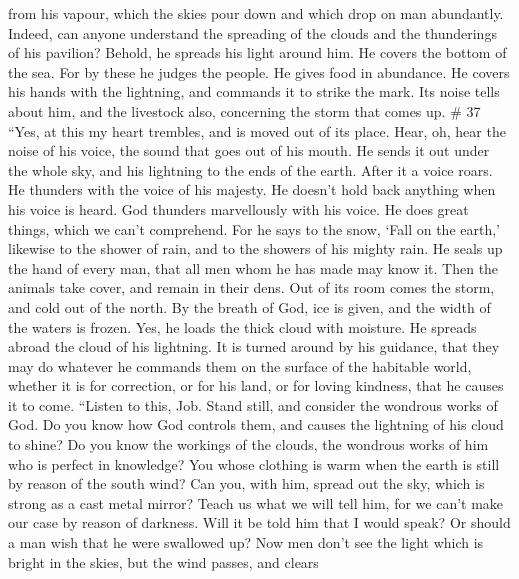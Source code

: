 from his vapour,  which the skies pour down and which drop
on man abundantly.  Indeed, can anyone understand the
spreading of the clouds and the thunderings of his pavilion?
 Behold, he spreads his light around him. He covers the
bottom of the sea.  For by these he judges the people. He
gives food in abundance.  He covers his hands with the
lightning, and commands it to strike the mark.  Its noise
tells about him, and the livestock also, concerning the storm that comes
up. \# 37  ``Yes, at this my heart trembles, and is moved
out of its place.  Hear, oh, hear the noise of his voice,
the sound that goes out of his mouth.  He sends it out under
the whole sky, and his lightning to the ends of the earth. 
After it a voice roars. He thunders with the voice of his majesty. He
doesn't hold back anything when his voice is heard.  God
thunders marvellously with his voice. He does great things, which we
can't comprehend.  For he says to the snow, `Fall on the
earth,' likewise to the shower of rain, and to the showers of his mighty
rain.  He seals up the hand of every man, that all men whom
he has made may know it.  Then the animals take cover, and
remain in their dens.  Out of its room comes the storm, and
cold out of the north.  By the breath of God, ice is given,
and the width of the waters is frozen.  Yes, he loads the
thick cloud with moisture. He spreads abroad the cloud of his lightning.
 It is turned around by his guidance, that they may do
whatever he commands them on the surface of the habitable world,
 whether it is for correction, or for his land, or for
loving kindness, that he causes it to come.  ``Listen to
this, Job. Stand still, and consider the wondrous works of God.
 Do you know how God controls them, and causes the
lightning of his cloud to shine?  Do you know the workings
of the clouds, the wondrous works of him who is perfect in knowledge?
 You whose clothing is warm when the earth is still by
reason of the south wind?  Can you, with him, spread out
the sky, which is strong as a cast metal mirror?  Teach us
what we will tell him, for we can't make our case by reason of darkness.
 Will it be told him that I would speak? Or should a man
wish that he were swallowed up?  Now men don't see the
light which is bright in the skies, but the wind passes, and clears
